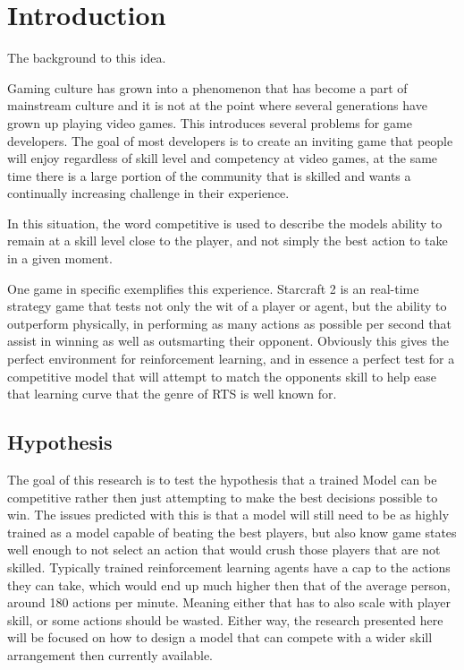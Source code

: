 \section{Introduction}
\label{sec:intro}
The background to this idea.

Gaming culture has grown into a phenomenon that has become a part of mainstream culture and it is not at the point where several generations have grown up playing video games. This introduces several problems for game developers. 
The goal of most developers is to create an inviting game that people will enjoy regardless of skill level and competency at video games, at the same time there is a large portion of the community that is skilled and wants a continually increasing 
challenge in their experience. 

In this situation, the word competitive is used to describe the models ability to remain at a skill level close to the player, and not simply the best action to take in a given moment.

One game in specific exemplifies this experience. Starcraft 2 is an real-time strategy game that tests not only the wit of a player or agent, but the ability to outperform physically, in performing as many actions as possible per second that assist in winning
as well as outsmarting their opponent. Obviously this gives the perfect environment for reinforcement learning, and in essence a perfect test for a competitive model that will attempt to match the opponents skill to help ease that learning curve that the genre
of RTS is well known for. 


\subsection{Hypothesis} 
\label{subsec:Hypothesis}
The goal of this research is to test the hypothesis that a trained Model can be competitive rather then just attempting to make the best decisions possible to win. The issues predicted with this is that a model will still need to be as highly trained as a model
capable of beating the best players, but also know game states well enough to not select an action that would crush those players that are not skilled. Typically trained reinforcement learning agents have a cap to the actions they can take, which would end up much 
higher then that of the average person, around 180 actions per minute\cite{vinyals2017starcraft}. Meaning either that has to also scale with player skill, or some actions should be wasted. Either way, the research presented here will be focused on how to design
a model that can compete with a wider skill arrangement then currently available. 

